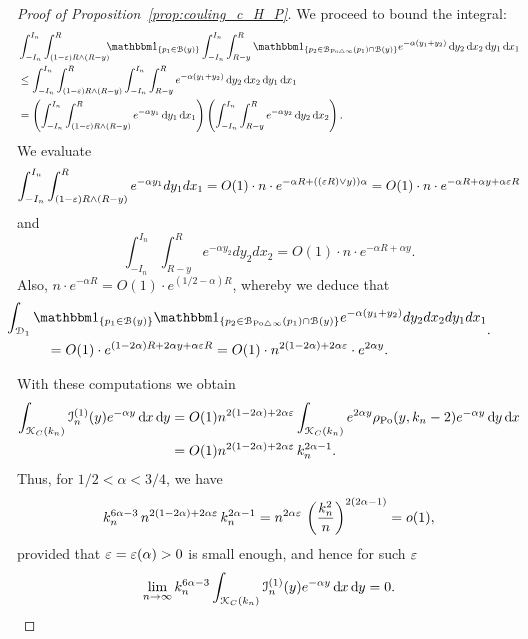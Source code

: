 \begin{proof}[Proof of Proposition~\ref{prop:couling_c_H_P}]
We proceed to bound the integral: 
\begin{align*}
	&\int_{-I_n}^{I_n} \int_{(1-\eps) R \wedge (R-y)}^{R} \hspace{-5pt} \ind{p_1 \in \BallHyp{y}}
		\int_{-I_n}^{I_n} \int_{R - y}^{R } \ind{p_2 \in \BallSym{p_1} \cap \BallHyp{y}} 
		e^{-\alpha(y_1 + y_2)} \dd y_2 \dd x_2 \dd y_1 \dd x_1 \\
	&\leq \int_{-I_n}^{I_n} \int_{(1-\eps) R \wedge (R-y)}^{R} 
		\int_{-I_n}^{I_n} \int_{R - y}^{R}  e^{-\alpha(y_1 + y_2)} \dd y_2 \dd x_2 \dd y_1 \dd x_1\\
	&= \left( \int_{-I_n}^{I_n} \int_{(1-\eps) R \wedge (R-y)}^{R} e^{- \alpha y_1} \dd y_1 \dd x_1 \right) 
	\left(\int_{-I_n}^{I_n} \int_{R - y}^{R}  e^{-\alpha y_2} \dd y_2 \dd x_2 \right).
\end{align*}
We evaluate
$$  \int_{-I_n}^{I_n} \int_{(1-\varepsilon) R \wedge (R-y)}^{R} 
e^{- \alpha y_1} dy_1 dx_1= O(1) \cdot n \cdot e^{-\alpha R + ((\varepsilon R) \vee y))\alpha}
=O(1) \cdot n \cdot e^{-\alpha R + \alpha y + \alpha \varepsilon R }
$$
and 
$$\int_{-I_n}^{I_n} \int_{R - y}^{R}  e^{-\alpha y_2} dy_2 dx_2 
=O(1) \cdot n \cdot e^{-\alpha R +\alpha y}.
$$
Also, $n \cdot e^{-\alpha R} = O(1) \cdot e^{(1/2 -\alpha) R}$, whereby we deduce that 
\begin{equation*}
\begin{split}
&\hspace{-30pt}\int_{\dom{1}} \ind{p_1 \in \BallHyp{y}} \ind{p_2 \in \BallSym{p_1} \cap \BallHyp{y}} 
 e^{-\alpha(y_1 + y_2)} dy_2 dx_2 dy_1 dx_1 \\
&=O(1) \cdot e^{(1-2\alpha)R + 2\alpha y + \alpha \eps R} =O(1) \cdot n^{2(1-2\alpha) + 2\alpha \eps} \cdot e^{2\alpha y}.
\end{split}.
\end{equation*}

With these computations we obtain
\begin{align*} 
	\int_{{\mathcal K}_{C}(k_n)} \mathcal{I}_n^{(1)}(y) e^{-\alpha y} \operatorname{\mathrm{d}\hspace{-2pt}} x \operatorname{\mathrm{d}\hspace{-2pt}} y
	&= O(1) n^{2(1-2\alpha) + 2\alpha \varepsilon}
		\int_{{\mathcal K}_{C}(k_n)} e^{2\alpha y} \rho_{{\mathrm{Po}}}(y,k_n-2) e^{-\alpha y} \operatorname{\mathrm{d}\hspace{-2pt}} y \operatorname{\mathrm{d}\hspace{-2pt}} x \\ 
	&=O(1) n^{2(1-2\alpha) + 2\alpha \varepsilon} \, k_n^{2\alpha - 1}.
\end{align*}
Thus, for $1/2 < \alpha < 3/4$, we have 
\begin{equation*}
k_n^{6 \alpha -3} \,  n^{2(1-2\alpha) + 2\alpha \varepsilon} \, k_n^{2\alpha -1} = 
n^{2\alpha \varepsilon} \, \left( \frac{k_n^2}{n} \right)^{2(2\alpha -1)} = o(1), 
\end{equation*}
provided that $\varepsilon = \varepsilon (\alpha)>0$ is small enough, and hence for such $\varepsilon$
\[
	\lim_{n \to \infty} k_n^{6\alpha - 3} \int_{{\mathcal K}_{C}(k_n)} \mathcal{I}_n^{(1)}(y) e^{-\alpha y} \operatorname{\mathrm{d}\hspace{-2pt}} x \operatorname{\mathrm{d}\hspace{-2pt}} y = 0.
\]


\end{proof}
